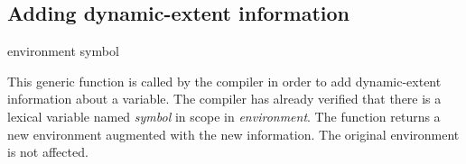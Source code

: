 \subsection{Adding dynamic-extent information}

 {environment symbol}

This generic function is called by the compiler in order to add
dynamic-extent information about a variable.  The compiler has already
verified that there is a lexical variable named \textit{symbol} in
scope in \textit{environment}.  The function returns a new environment
augmented with the new information.  The original environment is not
affected.


